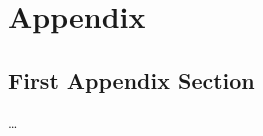 
\chapter{Appendix}
\label{ch:Appendix}

\section{First Appendix Section}
		
\setcounter{figure}{0}

\dots



